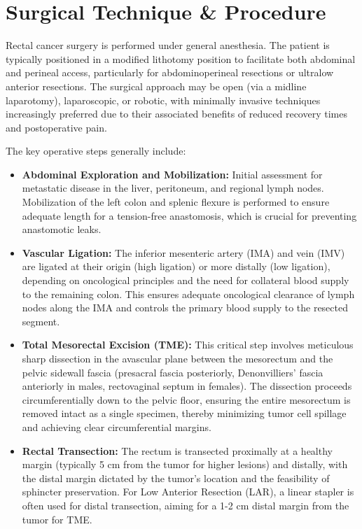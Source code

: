 \section*{Surgical Technique \& Procedure}
Rectal cancer surgery is performed under general anesthesia. The patient is typically positioned in a modified lithotomy position to facilitate both abdominal and perineal access, particularly for abdominoperineal resections or ultralow anterior resections. The surgical approach may be open (via a midline laparotomy), laparoscopic, or robotic, with minimally invasive techniques increasingly preferred due to their associated benefits of reduced recovery times and postoperative pain.

The key operative steps generally include:

\begin{itemize}
  \item \textbf{Abdominal Exploration and Mobilization:} Initial assessment for metastatic disease in the liver, peritoneum, and regional lymph nodes. Mobilization of the left colon and splenic flexure is performed to ensure adequate length for a tension-free anastomosis, which is crucial for preventing anastomotic leaks.
  
  \item \textbf{Vascular Ligation:} The inferior mesenteric artery (IMA) and vein (IMV) are ligated at their origin (high ligation) or more distally (low ligation), depending on oncological principles and the need for collateral blood supply to the remaining colon. This ensures adequate oncological clearance of lymph nodes along the IMA and controls the primary blood supply to the resected segment.
  
  \item \textbf{Total Mesorectal Excision (TME):} This critical step involves meticulous sharp dissection in the avascular plane between the mesorectum and the pelvic sidewall fascia (presacral fascia posteriorly, Denonvilliers' fascia anteriorly in males, rectovaginal septum in females). The dissection proceeds circumferentially down to the pelvic floor, ensuring the entire mesorectum is removed intact as a single specimen, thereby minimizing tumor cell spillage and achieving clear circumferential margins.
  
  \item \textbf{Rectal Transection:} The rectum is transected proximally at a healthy margin (typically 5 cm from the tumor for higher lesions) and distally, with the distal margin dictated by the tumor's location and the feasibility of sphincter preservation. For Low Anterior Resection (LAR), a linear stapler is often used for distal transection, aiming for a 1-2 cm distal margin from the tumor for TME.
  

\end{itemize}
